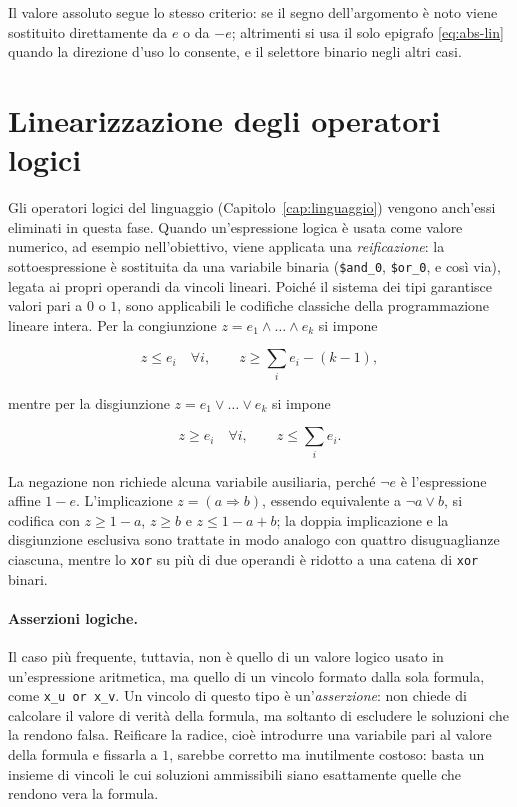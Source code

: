 Il valore assoluto segue lo stesso criterio: se il segno dell'argomento è noto
viene sostituito direttamente da $e$ o da $-e$; altrimenti si usa il solo
epigrafo \eqref{eq:abs-lin} quando la direzione d'uso lo consente, e il
selettore binario negli altri casi.

\section{Linearizzazione degli operatori logici}
\label{sec:linearizzazione-logica}

Gli operatori logici del linguaggio (Capitolo~\ref{cap:linguaggio}) vengono
anch'essi eliminati in questa fase. Quando un'espressione logica è usata come
valore numerico, ad esempio nell'obiettivo, viene applicata una
\emph{reificazione}: la sottoespressione è sostituita da una variabile
binaria (\texttt{\$and\_0}, \texttt{\$or\_0}, e così via), legata ai propri
operandi da vincoli lineari. Poiché il sistema dei tipi garantisce valori pari
a $0$ o $1$, sono applicabili le codifiche classiche della programmazione
lineare intera. Per la congiunzione $z = e_1 \land \dots \land e_k$ si impone

\begin{equation}
\label{eq:and-lin}
z \le e_i \quad \forall i, \qquad z \ge \textstyle\sum_i e_i - (k - 1),
\end{equation}

mentre per la disgiunzione $z = e_1 \lor \dots \lor e_k$ si impone

\begin{equation}
\label{eq:or-lin}
z \ge e_i \quad \forall i, \qquad z \le \textstyle\sum_i e_i.
\end{equation}

La negazione non richiede alcuna variabile ausiliaria, perché $\lnot e$ è
l'espressione affine $1 - e$. L'implicazione $z = (a \Rightarrow b)$, essendo
equivalente a $\lnot a \lor b$, si codifica con $z \ge 1 - a$, $z \ge b$ e $z
\le 1 - a + b$; la doppia implicazione e la disgiunzione esclusiva sono
trattate in modo analogo con quattro disuguaglianze ciascuna, mentre lo
\texttt{xor} su più di due operandi è ridotto a una catena di \texttt{xor}
binari.

\paragraph{Asserzioni logiche.}
Il caso più frequente, tuttavia, non è quello di un valore logico usato in
un'espressione aritmetica, ma quello di un vincolo formato dalla sola formula,
come \texttt{x\_u or x\_v}. Un vincolo di questo tipo è un'\emph{asserzione}: non
chiede di calcolare il valore di verità della formula, ma soltanto di escludere
le soluzioni che la rendono falsa. Reificare la radice, cioè introdurre una
variabile pari al valore della formula e fissarla a $1$, sarebbe corretto ma
inutilmente costoso: basta un insieme di vincoli le cui soluzioni ammissibili
siano esattamente quelle che rendono vera la formula.


